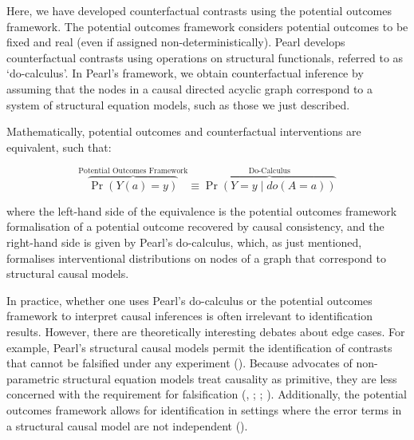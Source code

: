 \documentclass[
  single column]{article}
\begin{document}
Here, we have developed counterfactual contrasts using the potential
outcomes framework. The potential outcomes framework considers potential
outcomes to be fixed and real (even if assigned non-deterministically).
Pearl develops counterfactual contrasts using operations on structural
functionals, referred to as `do-calculus'. In Pearl's framework, we
obtain counterfactual inference by assuming that the nodes in a causal
directed acyclic graph correspond to a system of structural equation
models, such as those we just described.

Mathematically, potential outcomes and counterfactual interventions are
equivalent, such that:

\[
\overbrace{\Pr(Y(a) = y)}^{\text{Potential Outcomes Framework}} \equiv \overbrace{\Pr(Y = y \mid do(A = a))}^{\text{Do-Calculus}}
\]

where the left-hand side of the equivalence is the potential outcomes
framework formalisation of a potential outcome recovered by causal
consistency, and the right-hand side is given by Pearl's do-calculus,
which, as just mentioned, formalises interventional distributions on
nodes of a graph that correspond to structural causal models.

In practice, whether one uses Pearl's do-calculus or the potential
outcomes framework to interpret causal inferences is often irrelevant to
identification results. However, there are theoretically interesting
debates about edge cases. For example, Pearl's structural causal models
permit the identification of contrasts that cannot be falsified under
any experiment (). Because advocates of non-parametric structural equation models
treat causality as primitive, they are less concerned with the
requirement for falsification (, ;
;
).
Additionally, the potential outcomes framework allows for identification
in settings where the error terms in a structural causal model are not
independent ().
\end{document}
